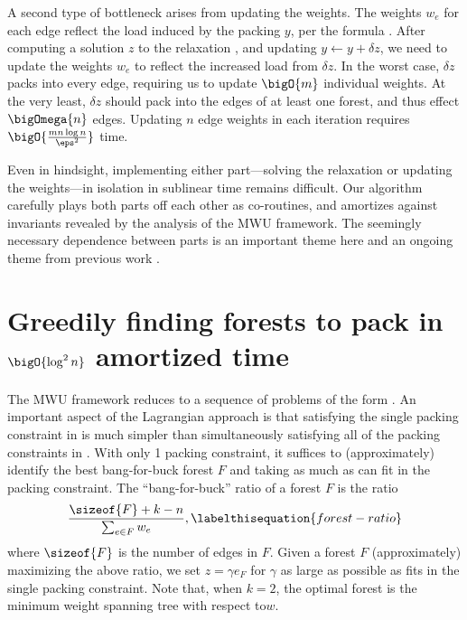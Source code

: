 \documentclass{toc}
\newcommand{\weight}[1]{w_{#1}}
\newcommand{\weightv}{w}%
\newcommand{\wrt}{with respect to\xspace} %
\begin{document}
A second type of bottleneck arises from updating the weights. The
weights $\weight{e}$ for each edge reflect the load induced by the
packing $y$, per the formula . After
computing a solution $z$ to the relaxation ,
and updating $y \gets y + \delta z$, we need to update the weights
$\weight{e}$ to reflect the increased load from $\delta z$. In the
worst case, $\delta z$ packs into every edge, requiring us to update
$\bigO{m}$ individual weights. At the very least, $\delta z$ should
pack into the edges of at least one forest, and thus effect
$\bigOmega{n}$ edges. Updating $n$ edge weights in each iteration
requires $\bigO{\frac{m n \log n}{\eps^2}}$ time.

Even in hindsight, implementing either part---solving the relaxation
or updating the weights---in %
isolation in sublinear time
%
%
remains difficult. Our algorithm carefully plays both parts off each other
as co-routines, and amortizes against invariants revealed by the analysis
of the MWU framework. The seemingly necessary dependence between parts
is an important theme
%
here %
and an ongoing theme from previous
work \cite{cq-17-focs,cq-17-soda,cq-19}.

\section{Greedily finding forests to pack in $\bigO{\log^2 n}$
  amortized time}


The MWU framework reduces  to a sequence
of problems of the form .  An important aspect
of the Lagrangian approach is that satisfying the single packing
constraint in  is much simpler than
simultaneously satisfying all of the packing constraints in
. With only 1 packing constraint, it
suffices to (approximately) identify the best bang-for-buck forest $F$
and taking as much as can fit in the packing constraint. The
``bang-for-buck'' ratio of a forest $F$ is the ratio
\begin{align*}
  \frac{\sizeof{F} + k - n}{\sum_{e \in F} \weight{e}},
  \labelthisequation{forest-ratio}
\end{align*}
where $\sizeof{F}$ is the number of edges in $F$. Given a forest $F$
(approximately) maximizing the above ratio, we set $z = \gamma e_F$
for $\gamma$ as large as possible as fits in the single packing
constraint. Note that, when $k = 2$, the optimal forest is the minimum
weight spanning tree \wrt $\weightv$.
\end{document}
